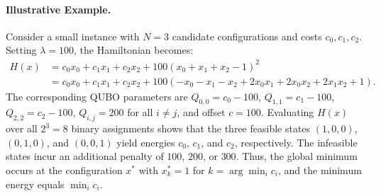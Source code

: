 \documentclass[12pt]{article}
\begin{document}
\paragraph{Illustrative Example.}
Consider a small instance with $N=3$ candidate configurations and costs $c_0, c_1, c_2$. Setting $\lambda = 100$, the Hamiltonian becomes:
\begin{align}
H(x) &= c_0 x_0 + c_1 x_1 + c_2 x_2 + 100(x_0 + x_1 + x_2 - 1)^2 \\
&= c_0 x_0 + c_1 x_1 + c_2 x_2 + 100\left(-x_0 - x_1 - x_2 + 2x_0 x_1 + 2x_0 x_2 + 2x_1 x_2 + 1\right).
\end{align}
The corresponding QUBO parameters are $Q_{0,0} = c_0 - 100$, $Q_{1,1} = c_1 - 100$, $Q_{2,2} = c_2 - 100$, $Q_{i,j} = 200$ for all $i \neq j$, and offset $c = 100$. Evaluating $H(x)$ over all $2^3 = 8$ binary assignments shows that the three feasible states $(1,0,0)$, $(0,1,0)$, and $(0,0,1)$ yield energies $c_0$, $c_1$, and $c_2$, respectively. The infeasible states incur an additional penalty of $100$, $200$, or $300$. Thus, the global minimum occurs at the configuration $x^*$ with $x^*_k = 1$ for $k = \arg\min_i c_i$, and the minimum energy equals $\min_i c_i$.
\end{document}
